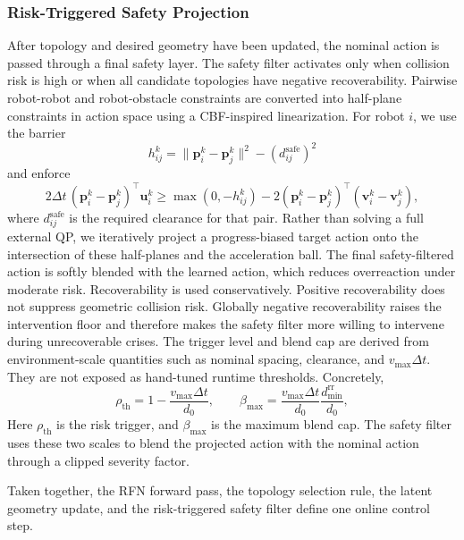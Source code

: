 \documentclass{ieeeaccess}
\newcommand{\bfu}{\mathbf{u}}
\newcommand{\bfp}{\mathbf{p}}
\newcommand{\bfv}{\mathbf{v}}
\begin{document}
\subsubsection{Risk-Triggered Safety Projection}
\label{sec:safety_filter}

After topology and desired geometry have been updated, the nominal
action is passed through a final safety layer. The safety filter activates
only when collision risk is high or when all candidate topologies have
negative recoverability. Pairwise robot-robot and robot-obstacle
constraints are converted into half-plane constraints in action space
using a CBF-inspired linearization. For robot $i$, we use the barrier
\begin{equation}
h_{ij}^k = \|\bfp_i^k - \bfp_j^k\|^2 - (d_{ij}^{\mathrm{safe}})^2
\label{eq:barrier}
\end{equation}
and enforce
\begin{equation}
2\Delta t\,(\bfp_i^k-\bfp_j^k)^\top \bfu_i^k \ge
\max(0,-h_{ij}^k) - 2(\bfp_i^k-\bfp_j^k)^\top(\bfv_i^k-\bfv_j^k),
\label{eq:cbf_constraint}
\end{equation}
where $d_{ij}^{\mathrm{safe}}$ is the required clearance for that pair.
Rather than solving a full external QP, we iteratively project a
progress-biased target action onto the intersection of these
half-planes and the acceleration ball. The final safety-filtered action is
softly blended with the learned action, which reduces overreaction
under moderate risk. Recoverability is used conservatively. Positive
recoverability does not suppress geometric collision risk. Globally
negative recoverability raises the intervention floor and therefore
makes the safety filter more willing to intervene during unrecoverable crises.
The trigger level and blend cap are derived from environment-scale
quantities such as nominal spacing, clearance, and $v_{\max}\Delta t$.
They are not exposed as hand-tuned runtime thresholds. Concretely,
\begin{equation}
\rho_{\mathrm{th}} =
1 - \frac{v_{\max}\Delta t}{d_0},
\qquad
\beta_{\max} =
\frac{v_{\max}\Delta t}{d_0}
\frac{d_{\min}^{\mathrm{rr}}}{d_0},
\label{eq:safety_filter_scales}
\end{equation}
Here $\rho_{\mathrm{th}}$ is the risk trigger, and $\beta_{\max}$ is
the maximum blend cap. The safety filter uses these two scales to blend the
projected action with the nominal action through a clipped severity
factor.

Taken together, the RFN forward pass, the topology selection rule, the
latent geometry update, and the risk-triggered safety filter define one online
control step.

\end{document}
